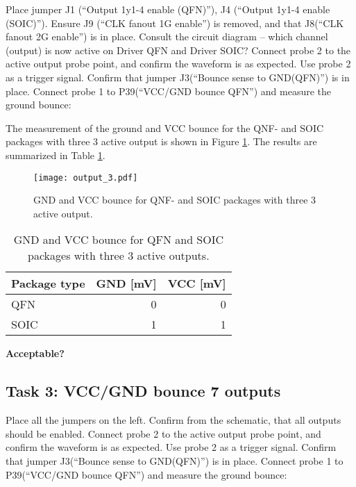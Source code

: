 \documentclass[../main.tex]{subfiles}
\begin{document}
Place jumper J1 (“Output 1y1-4 enable (QFN)”), J4 (“Output 1y1-4 enable (SOIC)”). Ensure J9 (“CLK fanout 1G enable”) is removed, and that J8(“CLK fanout 2G enable”) is in place.
\vspace{10pt}
Consult the circuit diagram – which channel (output) is now active on Driver QFN and Driver SOIC? Connect probe 2 to the active output probe point, and confirm the waveform is as expected. Use probe 2 as a trigger signal.
\vspace{10pt}
Confirm that jumper J3(“Bounce sense to GND(QFN)”) is in place. Connect probe 1 to P39(“VCC/GND bounce QFN”) and measure the ground bounce:

\solution

The measurement of the ground and VCC bounce for the QNF- and SOIC packages with three \(\textit{3}\) active output is shown in Figure \ref{fig:gnd_vcc_output_3}. The results are summarized in Table \ref{tab:output_3}.

\begin{figure}[H]
    \centering
    \texttt{[image: output\_3.pdf]}
    \caption{GND and VCC bounce for QNF- and SOIC packages with three \(\textit{3}\) active output.}
    \label{fig:gnd_vcc_output_3}
\end{figure}

\begin{table}[H]
    \centering
    \begin{tabular}{l | r r}
        \toprule[1pt]
        Package type    & GND [mV]  & VCC [mV]\\
        \midrule
        QFN             & 0         & 0  \\
        SOIC            & 1         & 1  \\
        \bottomrule[1pt]
    \end{tabular}
    \caption{GND and VCC bounce for QFN and SOIC packages with three \(\textit{3}\) active outputs.}
    \label{tab:output_3}
\end{table}

\textbf{Acceptable?}

\subsection{Task 3: VCC/GND bounce 7 outputs}

Place all the jumpers on the left. Confirm from the schematic, that all outputs should be enabled.
\vspace{10pt}
Connect probe 2 to the active output probe point, and confirm the waveform is as expected. Use probe 2 as a trigger signal.
\vspace{10pt}
Confirm that jumper J3(“Bounce sense to GND(QFN)”) is in place. Connect probe 1 to P39(“VCC/GND bounce QFN”) and measure the ground bounce:
\end{document}
